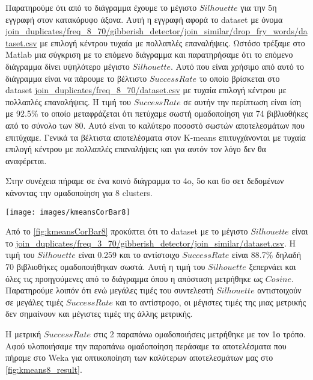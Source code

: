 Παρατηρούμε ότι από το διάγραμμα έχουμε το μέγιστο $Silhouette$ για την 5η εγγραφή στον κατακόρυφο άξονα. Αυτή η εγγραφή αφορά το dataset με όνομα \url{join_duplicates/freq_8_70/gibberish_detector/join_similar/drop_fry_words/dataset.csv} με επιλογή κέντρου τυχαία με πολλαπλές επαναλήψεις. Ωστόσο τρέξαμε στο Matlab μια σύγκριση με το επόμενο διάγραμμα και παρατηρήσαμε ότι το επόμενο διάγραμμα δίνει υψηλότερο μέγιστο $Silhouette$. Αυτό που είναι χρήσιμο από αυτό το διάγραμμα είναι να πάρουμε το βέλτιστο $Success Rate$ το οποίο βρίσκεται στο dataset \url{join_duplicates/freq_8_70/dataset.csv} με τυχαία επιλογή κέντρου με πολλαπλές επαναλήψεις. Η τιμή του $Success Rate$ σε αυτήν την περίπτωση είναι ίση με 92.5\% το οποίο μεταφράζεται ότι πετύχαμε σωστή ομαδοποίηση για 74 βιβλιοθήκες από το σύνολο των 80. Αυτό είναι το καλύτερο ποσοστό σωστών αποτελεσμάτων που επιτύχαμε. Γενικά τα βέλτιστα αποτελέσματα στον K-means επιτυγχάνονται με τυχαία επιλογή κέντρου με πολλαπλές επαναλήψεις και για αυτόν τον λόγο δεν θα αναφέρεται.

Στην συνέχεια πήραμε σε ένα κοινό διάγραμμα το 4o, 5ο και 6ο σετ δεδομένων κάνοντας την ομαδοποίηση για 8 clusters.

\noindent\begin{minipage}{\linewidth}
    \centering
    \texttt{[image: images/kmeansCorBar8]}
    \label{fig:kmeansCorBar8}
\end{minipage}

Από το \hyperref[fig:kmeansCorBar8]{\figurename{} \ref{fig:kmeansCorBar8}}
προκύπτει ότι το dataset με το μέγιστο $Silhouette$ είναι το \url{join_duplicates/freq_3_70/gibberish_detector/join_similar/dataset.csv}. Η τιμή του $Silhouette$ είναι 0.259 και το αντίστοιχο $SuccessRate$ είναι 88.7\% δηλαδή 70 βιβλιοθήκες ομαδοποιήθηκαν σωστά. Αυτή η τιμή του $Silhouette$ ξεπερνάει και όλες τις προηγούμενες από το διάγραμμα όπου η απόσταση μετρήθηκε ως $Cosine$. Παρατηρούμε λοιπόν ότι ενώ μεγάλες τιμές του συντελεστή $Silhouette$ αντιστοιχούν σε μεγάλες τιμές $SuccessRate$ και το αντίστροφο, οι μέγιστες τιμές της μιας μετρικής δεν σημαίνουν και μέγιστες τιμές της άλλης μετρικής.

Η μετρική $Success Rate$ στις 2 παραπάνω ομαδοποιήσεις μετρήθηκε με τον 1ο τρόπο.
Αφού υλοποιήσαμε την παραπάνω ομαδοποίηση περάσαμε τα αποτελέσματα που πήραμε στο Weka για οπτικοποίηση των καλύτερων αποτελεσμάτων μας
στο \hyperref[fig:kmeans8_result]{\figurename{} \ref{fig:kmeans8_result}}.

